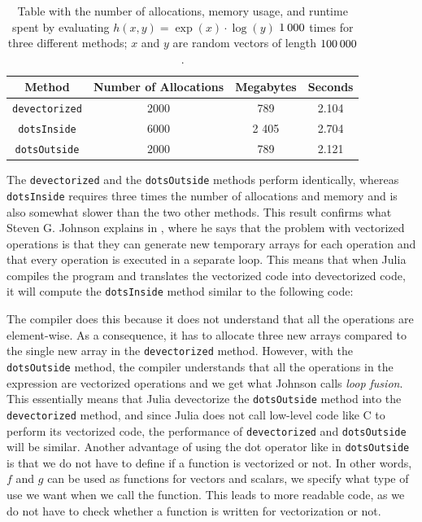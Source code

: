 \begin{table}[H]
    \centering
    \caption{Table  with  the  number  of  allocations,  memory  usage,  and  runtime  spent  by  evaluating $h(x,y) = \exp(x)\cdot\log(y)$ $1\hspace{0.2em}000$ times for three different methods; $x$ and $y$ are random vectors of length $100\hspace{0.2em}000$.}
    \label{tab:dotOperator}
    \def\arraystretch{1.5}
    \begin{tabular}{cccc}
    \textbf{Method} & \textbf{Number of Allocations} & \textbf{Megabytes} & \textbf{Seconds} \\
        \hline
         \texttt{devectorized} & 2000 & 789 & 2.104 \\
         \texttt{dotsInside} & 6000 & 2 405 & 2.704 \\ 
         \texttt{dotsOutside} & 2000 & 789 & 2.121 \\  
         \hline
    \end{tabular}
\end{table}
The \texttt{devectorized} and the \texttt{dotsOutside} methods perform  identically, whereas \texttt{dotsInside} requires three times the number of allocations and memory and is also somewhat slower than the two other methods. This result confirms what Steven G. Johnson explains in \emph{\cite{MoreDotsJuliaBlog}}, where he says that the problem with vectorized operations is that they can generate new temporary arrays for each operation and that every operation is executed in a separate loop. This means that when Julia compiles the program and translates the vectorized code into devectorized code, it will compute the \texttt{dotsInside} method similar to the following code:

The compiler does this because it does not understand that all the operations are element-wise. As a consequence, it has to allocate three new arrays compared to the single new array in the \texttt{devectorized} method. However, with the \texttt{dotsOutside} method, the compiler understands that all the operations in the expression are vectorized operations and we get what Johnson calls \textit{loop fusion}. This essentially means that Julia devectorize the \texttt{dotsOutside} method into the \texttt{devectorized} method, and since Julia does not call low-level code like C to perform its vectorized code, the performance of \texttt{devectorized} and \texttt{dotsOutside} will be similar. Another advantage of using the dot operator like in \texttt{dotsOutside} is that we do not have to define if a function is vectorized or not. In other words, $f$ and $g$ can be used as functions for vectors and scalars, we specify what type of use we want when we call the function. This leads to more readable code, as we do not have to check whether a function is written for vectorization or not.

